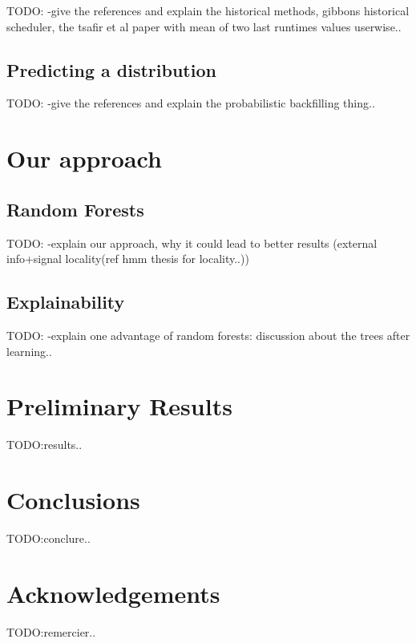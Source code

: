 \documentclass{article}
\begin{document}
TODO: -give the references and explain the historical methods, gibbons historical scheduler, the tsafir et al paper with mean of two last runtimes values userwise..


\subsection{Predicting a distribution}
\label{sub:predicting_a_distribution}

TODO: -give the references and explain the probabilistic backfilling thing..



\section{Our approach}
\label{sec:our_approach}

\subsection{Random Forests}
\label{sub:random_forests}
TODO: -explain our approach, why it could lead to better results (external info+signal locality(ref hmm thesis for locality..))

\subsection{Explainability}
\label{sub:explainability}
TODO: -explain one advantage of random forests: discussion about the trees after learning.. 


\section{Preliminary Results}
\label{sec:preliminary_results}

TODO:results..


\section{Conclusions}
\label{sec:conclusions}

TODO:conclure..



\section{Acknowledgements}
\label{sec:conclusions}

TODO:remercier..





\end{document}
